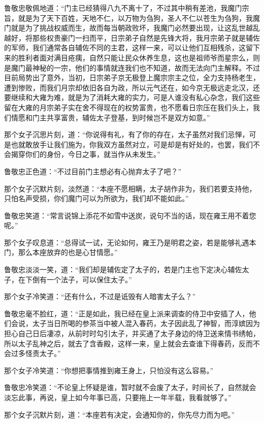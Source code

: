 鲁敬忠敬佩地道：“门主已经猜得八九不离十了，不过其中稍有差池，我魔门宗旨，就是为了天下百姓，天地不仁，以万物为刍狗，圣人不仁以苍生为刍狗，我魔门就是为了挑战权威而生，故而每当朝政败坏，我魔门必然要出现，让这乱世越乱越好，将那些权贵豪门一扫而平，日宗弟子自然是先锋大将，我月宗弟子就是辅佐的军师，我们通常各自辅佐不同的主君，这样一来，可以让他们互相残杀，这留下来的胜利者面对满目疮痍，自然只能让民众休养生息，这也是祖师爷而星宗么，则是魔门最神秘的一宗，他们的事情就连我们也不知道，故而无法向门主解释。不过目前局势出了意外，当初，日宗弟子京无极登上魔宗宗主之位，全力支持杨老生，遭到惨败，而我们月宗却依旧各自为政，所以元气还在，如今京无极远走北汉，还要继续和大雍为难，就是为了消耗大雍的实力，可是人谁没有私心杂念，我们这些留在大雍的月宗弟子实在舍不得现在的权势富贵，也不愿看日宗压在我们头上，我们情愿和门主共享富贵，辅佐太子登基，到时候岂不是双方如意。”

那个女子沉思片刻，道：“你说得有礼，有了你的存在，太子虽然对我们忌惮，可是也就敢放手让我们施为，你我双方虽然对立，可是却是有好处的，也罢，我们不会揭穿你们的身份，今日之事，就当作从未发生。”

鲁敬忠正色道：“不过目前门主想必有心抛弃太子了吧？”

那个女子沉默片刻，淡然道：“本座不愿相瞒，太子胡作非为，我们若要支持他，只怕名声受损，你们魔门可以为所欲为，我们却不能如此。”

鲁敬忠笑道：“常言说锦上添花不如雪中送炭，说句不当的话，现在雍王用不着您呢。”

那个女子叹息道：“总得试一试，无论如何，雍王乃是明君之姿，若是能够礼遇本门，那么本座放弃的也是心甘情愿。”

鲁敬忠淡淡一笑，道：“我们却是辅佐定了太子的，若是门主也下定决心辅佐太子，在下倒有一个法子，可以保住太子。”

那个女子冷笑道：“还有什么，不过是诋毁有人暗害太子么？”

鲁敬忠毫不脸红，道：“正是如此，我已经在皇上派来调查的侍卫中安插了人，他们会说，太子当日所喝的参茶当中被人混入春药，太子因此乱了神智，而淳嫔因为担心自己日后凄凉，从前时时勾引太子，并买通了太子身边的侍卫送来情书绣帕，所以太子乱神之后，就去了含香殿，这样一来，皇上就会去查谁下得春药，反而不会过多怪责太子。”

那个女子冷笑道：“你想把事情推到雍王身上，只怕没有这么容易。”

鲁敬忠冷笑道：“不论皇上怀疑是谁，暂时就不会废了太子，时间长了，自然就会淡忘此事，再说，皇上如今年事已高，只要拖上一年半载，我看就够了。”

那个女子沉默片刻，道：“本座若有决定，会通知你的，你先尽力而为吧。”


